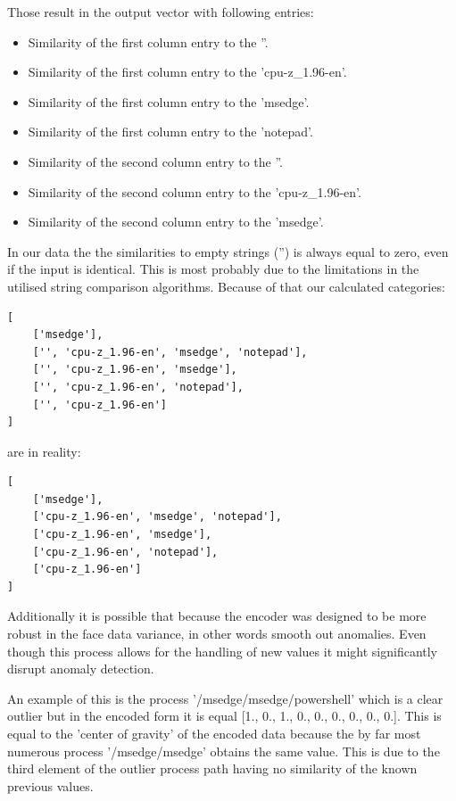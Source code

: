 \documentclass[a4paper,twoside,12pt]{book}
\begin{document}
Those result in the output vector with following entries:
\begin{itemize}
	\item Similarity of the first column entry to the ''.
	\item Similarity of the first column entry to the 'cpu-z\_1.96-en'.
	\item Similarity of the first column entry to the 'msedge'.
	\item Similarity of the first column entry to the 'notepad'.
	\item Similarity of the second column entry to the ''.
	\item Similarity of the second column entry to the 'cpu-z\_1.96-en'.
	\item Similarity of the second column entry to the 'msedge'.
\end{itemize}

In our data the the similarities to empty strings ('') is always equal to zero, even if the input
is identical. This is most probably due to the limitations in the utilised string comparison
algorithms. Because of that our calculated categories:
\begin{lstlisting}
[
	['msedge'],
	['', 'cpu-z_1.96-en', 'msedge', 'notepad'],
 	['', 'cpu-z_1.96-en', 'msedge'],
	['', 'cpu-z_1.96-en', 'notepad'],
 	['', 'cpu-z_1.96-en']
]
\end{lstlisting}

are in reality:

\begin{lstlisting}
[
	['msedge'],
	['cpu-z_1.96-en', 'msedge', 'notepad'],
	['cpu-z_1.96-en', 'msedge'],
	['cpu-z_1.96-en', 'notepad'],
	['cpu-z_1.96-en']
]
\end{lstlisting}



Additionally it is possible that because the encoder was designed to be more robust in the face 
data variance, in other words smooth out anomalies. Even though this process allows for the handling
of new values it might significantly disrupt anomaly detection.

An example of this is the process '/msedge/msedge/powershell' which is a clear outlier
but in the encoded form it is equal [1., 0., 1., 0., 0., 0., 0., 0., 0.]. This is equal
to the 'center of gravity' of the encoded data because the by far most numerous process
'/msedge/msedge' obtains the same value. This is due to the third element of the outlier process  
path having no similarity of the known previous values.
\end{document}
